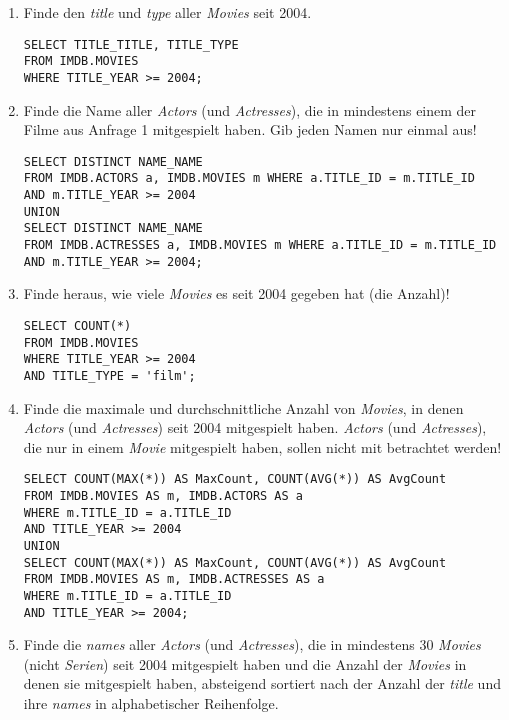 \documentclass[11pt,a4paper,DIV=9]{scrartcl}
\begin{document}
\begin{enumerate}

\item Finde den \textit{title} und \textit{type} aller \textit{Movies} seit 2004. 
\begin{lstlisting} 
SELECT TITLE_TITLE, TITLE_TYPE
FROM IMDB.MOVIES
WHERE TITLE_YEAR >= 2004;
\end{lstlisting}

\item Finde die Name aller \textit{Actors} (und \textit{Actresses}), die in mindestens einem der Filme aus Anfrage 1 mitgespielt haben. Gib jeden Namen nur einmal aus!
\begin{lstlisting}
SELECT DISTINCT NAME_NAME
FROM IMDB.ACTORS a, IMDB.MOVIES m WHERE a.TITLE_ID = m.TITLE_ID
AND m.TITLE_YEAR >= 2004
UNION
SELECT DISTINCT NAME_NAME
FROM IMDB.ACTRESSES a, IMDB.MOVIES m WHERE a.TITLE_ID = m.TITLE_ID
AND m.TITLE_YEAR >= 2004;
\end{lstlisting}

\item Finde heraus, wie viele \textit{Movies} es seit 2004 gegeben hat (die Anzahl)!
\begin{lstlisting}
SELECT COUNT(*)
FROM IMDB.MOVIES
WHERE TITLE_YEAR >= 2004
AND TITLE_TYPE = 'film';
\end{lstlisting}

\item Finde die maximale und durchschnittliche Anzahl von \textit{Movies}, in denen \textit{Actors} (und \textit{Actresses}) seit 2004 mitgespielt haben. \textit{Actors} (und \textit{Actresses}), die nur in einem \textit{Movie} mitgespielt haben, sollen nicht mit betrachtet werden!
\begin{lstlisting}
SELECT COUNT(MAX(*)) AS MaxCount, COUNT(AVG(*)) AS AvgCount
FROM IMDB.MOVIES AS m, IMDB.ACTORS AS a
WHERE m.TITLE_ID = a.TITLE_ID
AND TITLE_YEAR >= 2004
UNION
SELECT COUNT(MAX(*)) AS MaxCount, COUNT(AVG(*)) AS AvgCount
FROM IMDB.MOVIES AS m, IMDB.ACTRESSES AS a
WHERE m.TITLE_ID = a.TITLE_ID
AND TITLE_YEAR >= 2004;
\end{lstlisting}

\item Finde die \textit{names} aller \textit{Actors} (und \textit{Actresses}), die in mindestens 30 \textit{Movies} (nicht \textit{Serien}) seit 2004 mitgespielt haben und die Anzahl der \textit{Movies} in denen sie mitgespielt haben, absteigend sortiert nach der Anzahl der \textit{title} und ihre \textit{names} in alphabetischer Reihenfolge.
\begin{lstlisting}
\end{lstlisting}
\end{enumerate}
\end{document}
